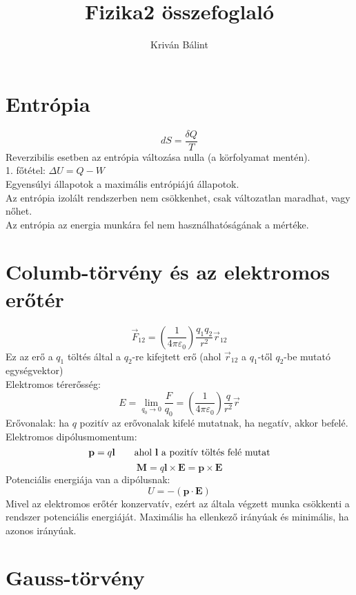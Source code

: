 \documentclass[12pt,a4paper,twocolumn]{article}
\title{Fizika2 összefoglaló}
\author{Kriván Bálint}
\date{}
\begin{document}
  \maketitle 
  
  \parindent 0pt

  \section{Entrópia}
  
  \[dS = \frac{\delta Q}{T}\]
  Reverzibilis esetben az entrópia változása nulla (a körfolyamat mentén).\\
  1. főtétel: $\Delta U = Q - W$\\
  Egyensúlyi állapotok a maximális entrópiájú állapotok.\\
  Az entrópia izolált rendszerben nem csökkenhet, csak változatlan maradhat, vagy nőhet.\\
  Az entrópia az energia munkára fel nem használhatóságának a mértéke.
  
  \section{Columb-törvény és az elektromos erőtér}
  
  \[\vec{F}_{12} = \left(\frac{1}{4\pi\varepsilon_0}\right)\frac{q_1q_2}{r^2}\vec{r}_{12}\]
  Ez az erő a $q_1$ töltés által a $q_2$-re kifejtett erő (ahol $\vec{r}_{12}$ a $q_1$-től $q_2$-be mutató egységvektor)\\

  Elektromos térerősség:
  \[E = \lim_{q_0 \to 0} \frac{F}{q_0} = \left(\frac{1}{4\pi\varepsilon_0}\right)\frac{q}{r^2}\vec{r}\]
  Erővonalak: ha $q$ pozitív az erővonalak kifelé mutatnak, ha negatív, akkor befelé.\\
  
  Elektromos dipólusmomentum:
  \[\mathbf{p} = q\mathbf{l} \qquad \hbox{ahol $\mathbf{l}$ a pozitív töltés felé mutat}\]
  \[\mathbf{M} = q\mathbf{l} \times \mathbf{E} = \mathbf{p} \times \mathbf{E}\]
  Potenciális energiája van a dipólusnak:
  \[U = - (\mathbf{p}\cdot\mathbf{E})\]
  Mivel az elektromos erőtér konzervatív, ezért az általa végzett munka
  csökkenti a rendszer potenciális energiáját. Maximális ha ellenkező irányúak és minimális, ha azonos irányúak.
  
  \section{Gauss-törvény}
  
\end{document}
